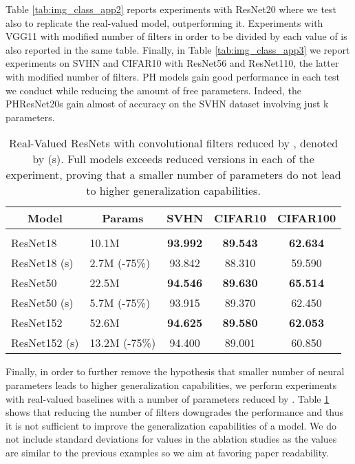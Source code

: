 \documentclass[lettersize,journal]{IEEEtran}
\begin{document}
Table \ref{tab:img_class_app2} reports experiments with ResNet20 where we test also  to replicate the real-valued model, outperforming it. Experiments with VGG11 with modified number of filters in order to be divided by each value of  is also reported in the same table. Finally, in Table \ref{tab:img_class_app3} we report experiments on SVHN and CIFAR10 with ResNet56 and ResNet110, the latter with modified number of filters.
PH models gain good performance in each test we conduct while reducing the amount of free parameters. Indeed, the PHResNet20s gain almost  of accuracy on the SVHN dataset involving just k parameters.

\begin{table}[t]
\caption{Real-Valued ResNets with convolutional filters reduced by , denoted by (s). Full models exceeds reduced versions in each of the experiment, proving that a smaller number of parameters do not lead to higher generalization capabilities.}
\label{tab:red_real}
\begin{center}
\begin{tabular}{llccc}
\multicolumn{1}{c}{\bf Model} &\multicolumn{1}{c}{\bf Params} &\multicolumn{1}{c}{\bf SVHN} &\multicolumn{1}{c}{\bf CIFAR10} &\multicolumn{1}{c}{\bf CIFAR100} \\
\hline \\
ResNet18            & 10.1M        & \textbf{93.992} & \textbf{89.543} & \textbf{62.634}  \\
ResNet18 (s)  & 2.7M (-75\%) & 93.842 & 88.310 & 59.590  \\
\hline
ResNet50            & 22.5M        & \textbf{94.546} & \textbf{89.630} & \textbf{65.514}  \\
ResNet50 (s)  & 5.7M (-75\%) & 93.915 & 89.370 & 62.450  \\
\hline
ResNet152           & 52.6M        & \textbf{94.625} & \textbf{89.580} & \textbf{62.053}  \\
ResNet152 (s) & 13.2M (-75\%)& 94.400 & 89.001 & 60.850  \\
\end{tabular}
\end{center}
\end{table}

Finally, in order to further remove the hypothesis that smaller number of neural parameters leads to higher generalization capabilities, we perform experiments with real-valued baselines with a number of parameters reduced by . Table \ref{tab:red_real} shows that reducing the number of filters downgrades the performance and thus it is not sufficient to improve the generalization capabilities of a model. We do not include standard deviations for values in the ablation studies as the values are similar to the previous examples so we aim at favoring paper readability.
\end{document}
